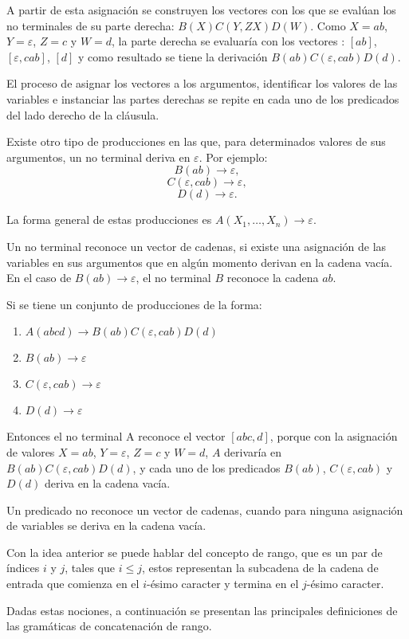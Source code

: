 A partir de esta  asignación se construyen los vectores con los que se evalúan los no terminales 
de su parte derecha: $B(X)C(Y,ZX)D(W)$. Como $X=ab$, $Y=\varepsilon$, $Z=c$ y $W=d$, la parte derecha se evaluaría con los vectores
: $[ab]$, $[\varepsilon, cab]$, $[d]$ y como resultado se tiene la derivación $B(ab)C(\varepsilon,cab)D(d)$.

El proceso de asignar los vectores a los argumentos, identificar los valores de las variables e instanciar las partes derechas se repite en cada uno de los predicados del lado derecho de la cláusula.

Existe otro tipo de producciones en las que, para determinados valores de sus argumentos, un no terminal deriva en $\varepsilon$. Por ejemplo: 
$$B(ab)\to \varepsilon,$$
$$C(\varepsilon,cab)\to \varepsilon,$$
$$D(d)\to \varepsilon.$$

La forma general de estas producciones es $A(X_1,\ldots, X_n)\rightarrow \varepsilon$.

Un no terminal reconoce un vector de cadenas, si existe una asignación de las variables 
en sus argumentos que en algún momento derivan en la cadena vacía. En el caso de $B(ab)\to \varepsilon$, 
el no terminal $B$ reconoce la cadena $ab$.

Si se tiene un conjunto de producciones de la forma:
\begin{enumerate}
    \item $A(abcd)\to B(ab)C(\varepsilon,cab)D(d)$
    \item $B(ab)\to \varepsilon$
    \item $C(\varepsilon,cab)\to \varepsilon$
    \item $D(d)\to \varepsilon$
\end{enumerate}
Entonces el no terminal A reconoce el vector $[abc,d]$, porque con la asignación de valores $X=ab$, $Y=\varepsilon$, $Z=c$ y $W=d$, $A$ derivaría en $B(ab)C(\varepsilon,cab)D(d)$,
y cada uno de los predicados $B(ab)$, $C(\varepsilon,cab)$ y $D(d)$ deriva en la cadena vacía.

Un predicado no reconoce un vector de cadenas, cuando para ninguna asignación de variables se deriva en la cadena vacía.

Con la idea anterior se puede hablar del concepto de rango, que es un par de índices $i$ y $j$, tales que $i\leq j$, estos
representan la subcadena de la cadena de entrada que comienza en el $i$-ésimo caracter y termina en el $j$-ésimo caracter.

Dadas estas nociones, a continuación se presentan las principales definiciones de las gramáticas de concatenación de rango.

